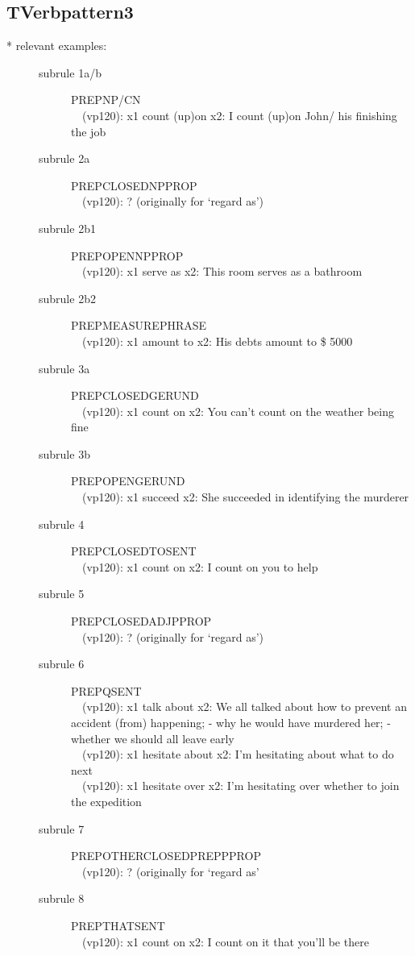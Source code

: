 \subsection{TVerbpattern3}
\begin{description}
\item[* relevant examples:] \mbox{}
\begin{description}
\item [subrule 1a/b] PREPNP/CN\\
\ \ (vp120): x1 count (up)on x2: I count (up)on John/ his finishing the 
job
\item [subrule 2a] PREPCLOSEDNPPROP\\
\ \ (vp120): ? (originally for `regard as')
\item [subrule 2b1] PREPOPENNPPROP\\
\ \ (vp120): x1 serve as x2: This room serves as a bathroom
\item [subrule 2b2] PREPMEASUREPHRASE\\
\ \ (vp120): x1 amount to x2: His debts amount to \$ 5000
\item [subrule 3a] PREPCLOSEDGERUND\\
\ \ (vp120): x1 count on x2: You can't count on the weather being fine
\item [subrule 3b] PREPOPENGERUND\\
\ \ (vp120): x1 succeed x2: She succeeded in identifying the murderer
\item [subrule 4] PREPCLOSEDTOSENT\\
\ \ (vp120): x1 count on x2: I count on you to help
\item [subrule 5] PREPCLOSEDADJPPROP\\
\ \ (vp120): ? (originally for `regard as')
\item [subrule 6] PREPQSENT\\
\ \ (vp120): x1 talk about x2: We all talked about how to prevent an accident 
(from) happening; - why he would have murdered her; - whether we should all 
leave early\\
\ \ (vp120): x1 hesitate about x2: I'm hesitating about what to do next\\
\ \ (vp120): x1 hesitate over x2: I'm hesitating over whether to join the 
expedition
\item [subrule 7] PREPOTHERCLOSEDPREPPPROP\\
\ \ (vp120): ? (originally for `regard as'
\item [subrule 8] PREPTHATSENT\\
\ \ (vp120): x1 count on x2: I count on it that you'll be there\\
\end{description}
\end{description}


